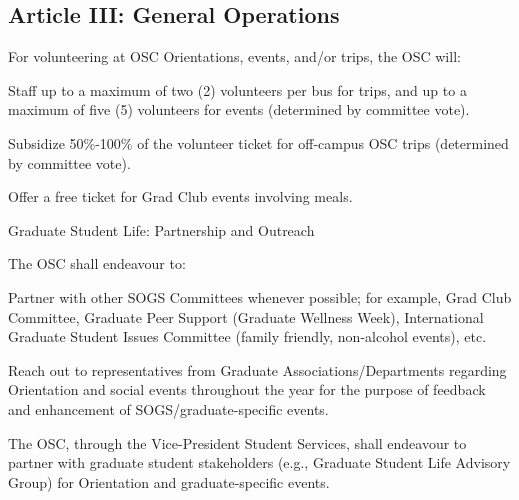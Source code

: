 \subsection{Article III: General Operations}
\begin{longenum}[ label*=\thesubsection.\arabic*., align=left] 
	\item For volunteering at OSC Orientations, events, and/or trips, the OSC will:
		\begin{longenum}[label*=\arabic*., align=left]
		\item Staff up to a maximum of two (2) volunteers per bus for trips, and up to a maximum of five (5) volunteers for events (determined by committee vote).
		\item Subsidize 50\%-100\% of the volunteer ticket for off-campus OSC trips (determined by committee vote).
		\item Offer a free ticket for Grad Club events involving meals.
		\end{longenum}
	\item Graduate Student Life: Partnership and Outreach
		\begin{longenum}[label*=\arabic*., align=left]
		\item The OSC shall endeavour to:
			\begin{longenum}[label*=\arabic*., align=left]
			\item Partner with other SOGS Committees whenever possible; for example, Grad Club Committee, Graduate Peer Support (Graduate Wellness Week), International Graduate Student Issues Committee (family friendly, non-alcohol events), etc.
			\item Reach out to representatives from Graduate Associations/Departments regarding Orientation and social events throughout the year for the purpose of feedback and enhancement of SOGS/graduate-specific events.
			\end{longenum}
		\item The OSC, through the Vice-President Student Services, shall endeavour to partner with graduate student stakeholders (e.g., Graduate Student Life Advisory Group) for Orientation and graduate-specific events.
		\end{longenum}



\end{longenum}
